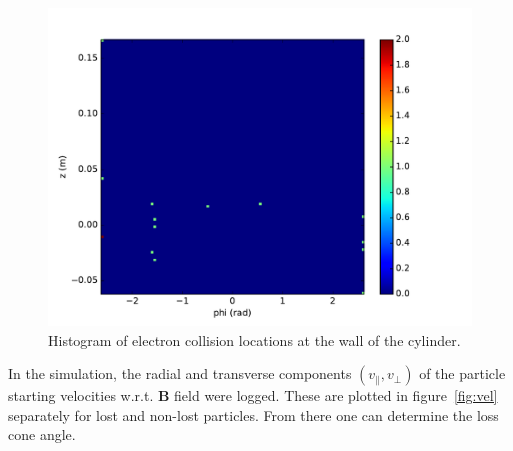 \documentclass[11pt, a4paper]{article}
\begin{document}
\begin{figure}
    \centering
    \includegraphics[width=\textwidth]{output/cylinder_collision_points.pdf}
    \caption{Histogram of electron collision locations at the wall of the cylinder.}
    \label{fig:wall}
\end{figure}

In the simulation, the radial and transverse components $(v_\parallel, v_\perp)$ of the particle starting velocities w.r.t. $\mathbf{B}$ field were logged. These are plotted in figure~\ref{fig:vel} separately for lost and non-lost particles. From there one can determine the loss cone angle.
\end{document}
